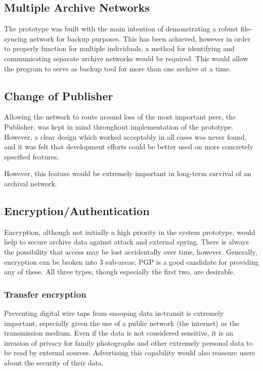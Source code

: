 \documentclass[12pt,a4paper,]{adreport}
\begin{document}
\subsection{Multiple Archive Networks}\label{multiple-archive-networks}

The prototype was built with the main intention of demonstrating a robust file-syncing network for backup purposes. This has been achieved, however in order to properly function for multiple individuals, a method for identifying and communicating separate archive networks would be required. This would allow the program to serve as backup tool for more than one archive at a time.

\subsection{Change of Publisher}\label{change-of-publisher}

Allowing the network to route around loss of the most important peer, the Publisher, was kept in mind throughout implementation of the prototype. However, a clear design which worked acceptably in all cases was never found, and it was felt that development efforts could be better used on more concretely specified features.

However, this feature would be extremely important in long-term survival of an archival network.

\subsection{Encryption/Authentication}\label{encryptionauthentication}

Encryption, although not initially a high priority in the system
prototype, would help to secure archive data against attack and external spying. There is always the possibility that access may be lost accidentally over time, however. Generally, encryption can be broken into 3 sub-areas; PGP is a good candidate
for providing any of these. All three types, though especially the first
two, are desirable.

\subsubsection{Transfer encryption}\label{transfer-encryption}

Preventing digital wire taps from snooping data in-transit is
extremely important, especially given the use of a public network (the
internet) as the transmission medium. Even if the data is not considered sensitive, it is an invasion of privacy for family photographs and other extremely personal data to be read by external sources. Advertising this capability would also reassure users about the security of their data.
\end{document}
